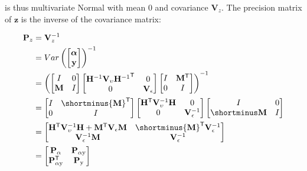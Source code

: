 \documentclass[notitlepage,a4paper,12pt]{article}
\newcommand{\transpose}[1]{{#1}^{\sf{T}}}
\begin{document}
is thus multivariate Normal with mean 0 and covariance $\mathbf{V}_z$. The precision matrix of $\mathbf{z}$ is the inverse of the covariance matrix: 

\begin{align*}
    \mathbf{P}_z 
    &= 
    \mathbf{V}^{-1}_z \\
    &= 
    Var\left(
    \begin{bmatrix}
        \boldsymbol{\alpha} \\
        \mathbf{y}
    \end{bmatrix}
    \right)^{-1} \\
    &=  
    \left(
    \begin{bmatrix}
        I & 0 \\
        \mathbf{M} & I
    \end{bmatrix}
    \begin{bmatrix}
        \mathbf{H}^{-1} \mathbf{V}_{\upsilon} \transpose{\mathbf{H}^{-1}} & 0 \\
        0 & \mathbf{V}_{\epsilon}
    \end{bmatrix} 
    \begin{bmatrix}
        I & \transpose{\mathbf{M}} \\
        0 & I
    \end{bmatrix}
    \right)^{-1}\\
    &=
    \begin{bmatrix}
        I & \shortminus\transpose{\mathbf{M}} \\
        0 & I
    \end{bmatrix}
    \begin{bmatrix}
        \transpose{\mathbf{H}} \mathbf{V}^{-1}_{\upsilon} \mathbf{H} & 0 \\
        0 & \mathbf{V}^{-1}_{\epsilon}
    \end{bmatrix} 
    \begin{bmatrix}
        I & 0 \\
        \shortminus\mathbf{M} & I 
    \end{bmatrix} \\
    &=
    \begin{bmatrix}
         \transpose{\mathbf{H}} \mathbf{V}^{-1}_{\upsilon} \mathbf{H} + \transpose{\mathbf{M}}\mathbf{V}_{\epsilon}\mathbf{M}  & \shortminus \transpose{\mathbf{M}} \mathbf{V}^{-1}_{\epsilon} \\
         \mathbf{V}^{-1}_{\epsilon} \mathbf{M} & \mathbf{V}^{-1}_{\epsilon}
    \end{bmatrix} \\
    &= 
    \begin{bmatrix}
        \mathbf{P}_{\alpha} & \mathbf{P}_{\alpha\text{y}} \\
        \transpose{\mathbf{P}}_{\alpha \text{y}} & \mathbf{P}_{\text{y}}  
    \end{bmatrix}
\end{align*}
\end{document}
